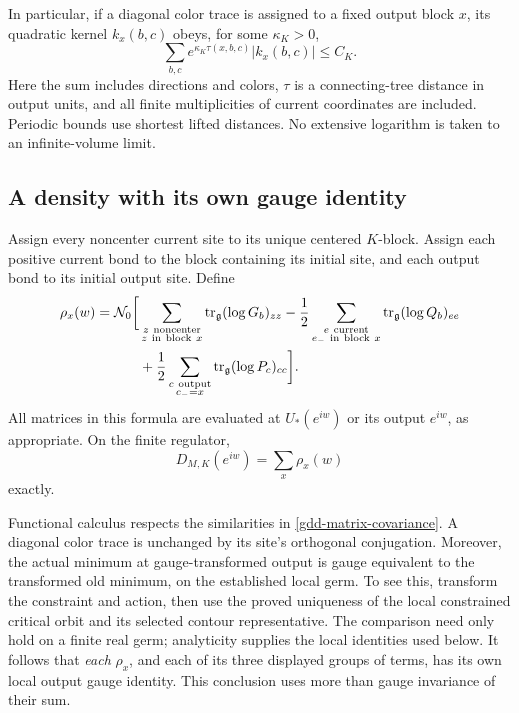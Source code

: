\documentclass[11pt]{article}
\theoremstyle{remark}
\begin{document}
In particular, if a diagonal color trace is assigned
to a fixed output block \(x\), its quadratic kernel
\(k_x(b,c)\) obeys, for some \(\kappa_K>0\),
\begin{equation}
 \sum_{b,c}e^{\kappa_K\tau(x,b,c)}|k_x(b,c)|\le C_K.
 \label{gdd-rooted-kernel}
\end{equation}
Here the sum includes directions and colors, \(\tau\)
is a connecting-tree distance in output units, and all
finite multiplicities of current coordinates are included.
Periodic bounds use shortest lifted distances. No extensive
logarithm is taken to an infinite-volume limit.

\subsection{A density with its own gauge identity}
\label{gdd-density-section}

Assign every noncenter current site to its unique centered
\(K\)-block. Assign each positive current bond to the block
containing its initial site, and each output bond to its
initial output site. Define
\begin{align}
 \rho_x(w)=\mathcal N_0\bigg[
 &\sum_{\substack{z\ {\rm noncenter}\\z\ {\rm in\ block}\ x}}
                   \operatorname{tr}_{\mathfrak g}(\log G_b)_{zz}
 -\frac12\sum_{\substack{e\ {\rm current}\\e_-\ {\rm in\ block}\ x}}
                   \operatorname{tr}_{\mathfrak g}(\log Q_b)_{ee}
 \notag\\
 &+\frac12\sum_{\substack{c\ {\rm output}\\c_-=x}}
                   \operatorname{tr}_{\mathfrak g}(\log P_c)_{cc}
 \bigg].
 \label{gdd-density}
\end{align}
All matrices in this formula are evaluated at \(U_*(e^{iw})\)
or its output \(e^{iw}\), as appropriate. On the finite
regulator,
\begin{equation}
                         D_{M,K}(e^{iw})=\sum_x\rho_x(w)
 \label{gdd-density-total}
\end{equation}
exactly.

Functional calculus respects the similarities in
\eqref{gdd-matrix-covariance}. A diagonal color trace is
unchanged by its site's orthogonal conjugation. Moreover,
the actual minimum at gauge-transformed output is gauge
equivalent to the transformed old minimum, on the established
local germ. To see this, transform the constraint and action,
then use the proved uniqueness of the local constrained
critical orbit and its selected contour representative.
The comparison need only hold on a finite real germ;
analyticity supplies the local identities used below.
It follows that \emph{each} \(\rho_x\), and each of its
three displayed groups of terms, has its own local
output gauge identity. This conclusion uses more than
gauge invariance of their sum.
\end{document}
